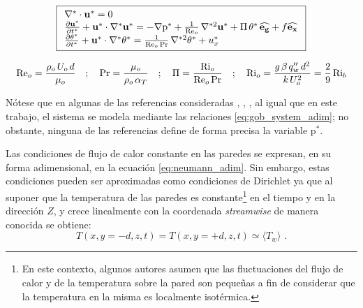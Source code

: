 \begin{equation}
\boxed{
\begin{array}{l}
    \nabla^* \cdot \mathbf{u^*} = 0 \\
    \frac{\partial \mathbf{u^*}}{\partial t^*} + \mathbf{u^*} \cdot \nabla^* \mathbf{u^*} = 
    -\nabla \text{p}^* + \frac{1}{\text{Re}_o} \hspace{0.5mm} \nabla^{*2} \mathbf{u^*} + \Pi \hspace{0.5mm} \theta^* \hspace{0.5mm} \mathbf{\widehat{e_g}} + f \mathbf{\widehat{e_x}}  \\
    \frac{\partial \theta^*}{\partial t^*} + \mathbf{u^*} \cdot \nabla^* \theta^* = 
    \frac{1}{\text{Re}_o \hspace{0.5mm} \text{Pr}} \hspace{0.5mm} \nabla^{*2} \theta^* + u_x^* 
\end{array}
}
\label{eq:gob_system_adim}
\end{equation}

\begin{equation}
\text{Re}_o = \frac{\rho_o \hspace{0.5mm} U_o \hspace{0.5mm} d }{\mu_o} \quad ; \quad \text{Pr}= \frac{\mu_o}{\rho_o \hspace{0.5mm} \alpha_{T}} \quad ; \quad \Pi = \frac{\text{Ri}_o}{\text{Re}_o \hspace{0.5mm} \text{Pr}} \quad ; \quad \text{Ri}_o = \frac{g \hspace{0.5mm} \beta \hspace{0.5mm} q''_w \hspace{0.5mm} d^2}{k \hspace{0.5mm} U_o^2} = \frac{2}{9} \hspace{0.5mm} \text{Ri}_b
\label{eq:num_adim}
\end{equation}

Nótese que en algunas de las referencias consideradas \cite{guo2022direct}, \cite{zhou2024direct}, \cite{tao1960}, al igual que en este trabajo, el sistema se modela \linebreak mediante las relaciones \ref{eq:gob_system_adim}; no obstante, ninguna de las referencias define de forma precisa la variable $\text{p}^*$.

Las condiciones de flujo de calor constante en las paredes se expresan, en su forma adimensional, en la ecuación \ref{eq:neumann_adim}. Sin embargo, estas condiciones pueden ser \linebreak aproximadas como condiciones de Dirichlet ya que al suponer que la temperatura de las paredes es constante\footnote{En este contexto, algunos autores \cite{kasagi1992direct} asumen que las fluctuaciones del flujo de calor y de la temperatura sobre la pared son pequeñas a fin de considerar que la temperatura en la misma es localmente isotérmica.} en el tiempo y en la dirección $Z$, y crece linealmente con la coordenada \textit{streamwise} de manera conocida se obtiene:
$$T(x,y=-d,z,t) = T(x,y=+d,z,t) \simeq \langle T_w \rangle \text{ .} $$

